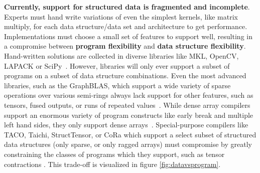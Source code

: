 %
\textbf{Currently, support for structured data is fragmented and incomplete}.
%
Experts must hand write variations of even the simplest kernels, like matrix
multiply, for each data structure/data set and architecture to get performance.
%
Implementations must choose a small set of features to support well, resulting
in a compromise between \textbf{program flexibility} and \textbf{data structure
flexibility}.
%
Hand-written solutions are collected in diverse libraries like
MKL, OpenCV, LAPACK or SciPy~\cite{ bradski2000opencv, anderson1999lapack, virtanen2020scipy, psarras2022linear}. 
%
However, libraries will only ever support a subset of
programs on a subset of data structure combinations.
%
Even the most advanced
libraries, such as the GraphBLAS, which support a wide variety of sparse
operations over various semi-rings always lack support for other features, such
as tensors, fused outputs, or runs of repeated values~\cite{bulucc2017design, mattson2019lagraph}.
%
While dense array
compilers support an enormous variety of program constructs like early break and
multiple left hand sides, they only support dense arrays~\cite{ragan-kelley_halide_2013,grosser2012polly}.  
%
Special-purpose
compilers like TACO, Taichi, StructTensor, or CoRa which support a select subset of structured data
structures (only sparse, or only ragged arrays) must compromise by greatly
constraining the classes of programs which they support, such as tensor
contractions \cite{kjolstad_tensor_2019, hu_taichi_2019, ghorbani2023compiling, fegade_cora_2022}. 
%
This trade-off is visualized in figure \ref{fig:datavsprogram}.
%


